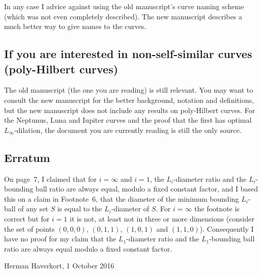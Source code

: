 \documentclass[11pt,a4paper]{article}
\begin{document}
In any case I advice against using the old manuscript's curve naming scheme (which was not even completely described). The new manuscript describes a much better way to give names to the curves.

\subsection*{If you are interested in non-self-similar curves (poly-Hilbert curves)}
The old manuscript (the one you are reading) is still relevant. You may want to consult the new manuscript for the better background, notation and definitions, but the new manuscript does not include any results on poly-Hilbert curves. For the Neptunus, Luna and Iupiter curves and the proof that the first has optimal $L_\infty$-dilation, the document you are currently reading is still the only source.

\subsection*{Erratum}
On page~7, I claimed that for $i = \infty$ and $i = 1$, the $L_i$-diameter ratio and the $L_i$-bounding ball ratio are always equal, modulo a fixed constant factor, and I based this on a claim in Footnote~6, that the diameter of the minimum bounding $L_i$-ball of any set $S$ is equal to the $L_i$-diameter of $S$. For $i = \infty$ the footnote is correct but for $i = 1$ it is not, at least not in three or more dimensions (consider the set of points $(0,0,0)$, $(0,1,1)$, $(1,0,1)$ and $(1,1,0)$). Consequently I have no proof for my claim that the $L_1$-diameter ratio and the $L_1$-bounding ball ratio are always equal modulo a fixed constant factor.

\addvspace\baselineskip
\raggedleft Herman Haverkort, 1 October 2016
\end{document}

